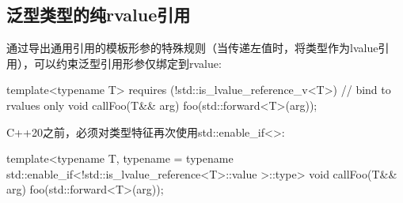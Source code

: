 \subsection{泛型类型的纯rvalue引用}

通过导出通用引用的模板形参的特殊规则（当传递左值时，将类型作为lvalue引用），可以约束泛型引用形参仅绑定到rvalue:

\begin{cppcode}
template<typename T>
requires (!std::is_lvalue_reference_v<T>) // bind to rvalues only
void callFoo(T&& arg) {
	foo(std::forward<T>(arg));
}
\end{cppcode}

C++20之前，必须对类型特征再次使用std::enable_if<>:

\begin{cppcode}
template<typename T,
	typename
		= typename std::enable_if<!std::is_lvalue_reference<T>::value
			>::type>
void callFoo(T&& arg) {
	foo(std::forward<T>(arg));
}
\end{cppcode}


